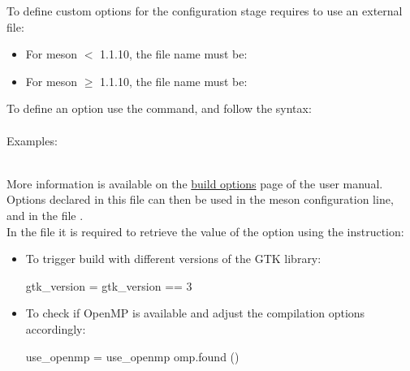 To define custom options for the configuration stage requires to use an external file: 
\begin{itemize}
\item For meson $<$ 1.1.10, the file name must be: 
\item For meson $\ge$ 1.1.10, the file name must be: 
\end{itemize}
To define an option use the  command, and follow the syntax:\\[0.25cm]
{\small{
\\[0.5cm]
}}
Examples:
{\footnotesize{
\begin{script}
\end{script}
}}
\\[-0.5cm]
\noindent More information is available on the \href{https://mesonbuild.com/Build-options.html}{build options} page of the user manual. \\[0.25cm] 
Options declared in this file can then be used in the meson configuration line, and in the file . \\
In the file  it is required to retrieve the value of the option using the  instruction:
\begin{itemize}
\item To trigger build with different versions of the GTK library:
{\footnotesize{
\begin{scripti}
gtk\_version = 
 gtk\_version == 3
   
   
\end{scripti}
}}
\item To check if OpenMP is available and adjust the compilation options accordingly:
{\footnotesize{
\begin{scripti}
use\_openmp = 
 use\_openmp
   
   omp.found ()
\end{scripti}
}}
\end{itemize}
\vspace{-0.5cm}

